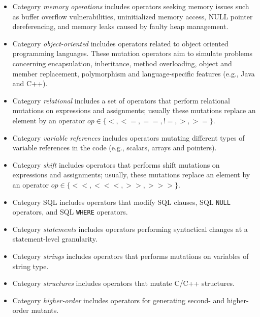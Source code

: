 \begin{itemize}
\item Category \emph{memory operations} includes operators seeking memory issues such as buffer overflow vulnerabilities, uninitialized memory access, NULL pointer dereferencing, and memory leaks caused by faulty heap management.
\item Category \emph{object-oriented} includes operators related to object oriented programming languages. These mutation operators aim to simulate problems concerning encapsulation, inheritance, method overloading, object and member replacement, polymorphism and language-specific features (e.g., Java and C++).
\item Category \emph{relational} includes a set of operators that perform relational mutations on expressions and assignments; usually these mutations replace an element by an operator $op \in \{<, <=, ==, !=, >, >=\}$.
\item Category \emph{variable references} includes operators mutating different types of variable references in the code (e.g., scalars, arrays and pointers).
\item Category \emph{shift} includes operators that performs shift mutations on expressions and assignments; usually, these mutations replace an element by an operator $op \in \{<<, <<<, >>, >>>\}$.
\item Category SQL includes operators that modify SQL clauses, SQL \texttt{NULL} operators, and SQL \texttt{WHERE} operators.
\item Category \emph{statements} includes operators performing syntactical changes at a statement-level granularity.
\item Category \emph{strings} includes operators that performs mutations on variables of string type.
\item Category \emph{structures} includes operators that mutate C/C++ structures.
\item Category \emph{higher-order} includes operators for generating second- and higher-order mutants.  

\end{itemize}
